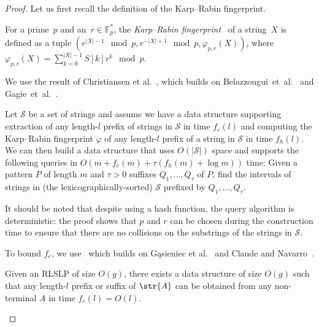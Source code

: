 \begin{proof}
    Let us first recall the definition of the Karp--Rabin fingerprint.
    
    \begin{definition}
    For a prime~$p$ and an~$r \in \mathbb{F}_p^\ast$, the \emph{Karp--Rabin fingerprint}~\cite{KRfingerprint} of a string~$X$ is defined as a tuple $(r^{|X|-1} \mod p, r^{-|X|+1} \mod p, \varphi_{p,r}(X))$, where $\varphi_{p,r}(X)=\sum_{k=0}^{|X|-1} S[k]r^k\mod p$.
    \end{definition}
    
    \noindent We use the result of Christiansen et al.~\cite{talg/ChristiansenEKN21}, which builds on Belazzougui~et~al.~\cite{esa/BelazzouguiBPV10} and Gagie~et~al.~\cite{latin/GagieGKNP14,soda/GagieNP18}.
     
    \begin{fact}\label{fact:compact_trie}
    Let $\mathcal{S}$ be a set of strings and assume we have a data structure supporting extraction of any length-$l$ prefix of strings in $\mathcal{S}$ in
    time $f_e(l)$ and computing the Karp--Rabin fingerprint $\varphi$ of any length-$l$ prefix of a string in $\mathcal{S}$
    in time $f_h(l)$. We can then build a data structure that uses $O(|\mathcal{S}|)$ space and supports the following queries in $O(m + f_e (m) + \tau ( f_h (m) + \log m))$ time: Given a pattern $P$ of length $m$ and $\tau > 0$
    suffixes $Q_1,\dots,Q_{\tau}$ of $P$, find the intervals of strings in (the lexicographically-sorted) $\mathcal{S}$ prefixed by
    $Q_1,\dots,Q_{\tau}$.
    \end{fact}
    
    It should be noted that despite using a hash function, the query algorithm is deterministic: the proof shows that $p$ and $r$ can be chosen during the construction time to ensure that there are no collisions on the substrings of the strings in $\mathcal{S}$.  
    
    To bound $f_e$, we use~\cite[Lemma 6.6]{talg/ChristiansenEKN21} which builds on G\k{a}sieniec et al.~\cite{dcc/GasieniecKPS05} and Claude and Navarro~\cite{spire/ClaudeN12a}.
    
    \begin{fact}\label{fact:prefsuf_extraction} Given an RLSLP
    of size $O(g)$, there exists a data structure of size $O(g)$ such that any length-$l$ prefix or suffix of $\str{A}$ can be
    obtained from any non-terminal $A$ in time $f_e(l) = O(l)$.
    \end{fact}
    

\end{proof}
